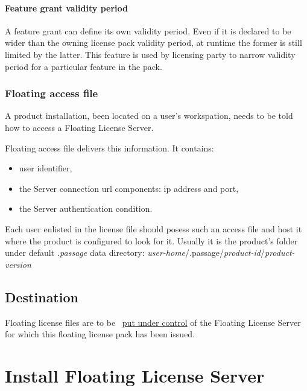 \documentclass[12pt]{report}
\begin{document}
\subsubsection*{Feature grant validity period} \label{sec:flp-content-valid}
A feature grant can define its own validity period. 
Even if it is declared to be wider than the owning license pack validity period, at runtime the former is still limited by the latter.
This feature is used by licensing party to narrow validity period for a particular feature in the pack.

\subsection*{Floating access file} \label{sec:flp-content-access}
A product installation, been located on a user's workspation, needs to be told how to access a Floating License Server.

Floating access file delivers this information. It contains:
\begin{itemize}
  \item user identifier,
  \item the Server connection url components: ip address and port,
  \item the Server authentication condition.
\end{itemize} 

Each user enlisted in the license file should posess such an access file and host it where the product is configured to look for it.
Usually it is the product's folder under default \textit{.passage} data directory: \textit{user-home}/.passage/\textit{product-id}/\textit{product-version} 

\section*{Destination} \label{sec:flp-destination}

Floating license files are to be ~\hyperref[sec:fls-commands-upload]{put under control} of the Floating License Server for which this floating license pack has been issued.

\chapter*{Install Floating License Server} \label{ch:install-fls}
\end{document}
